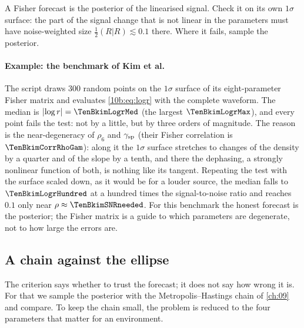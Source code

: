 \begin{keyidea}
A Fisher forecast is the posterior of the linearised signal. Check it on its own $1\sigma$ surface: the part of the
signal change that is not linear in the parameters must have noise-weighted size $\tfrac12(R|R)\lesssim0.1$ there.
Where it fails, sample the posterior.
\end{keyidea}

\paragraph{Example: the benchmark of Kim et al.} The script  draws $300$ random points on the
$1\sigma$ surface of its eight-parameter Fisher matrix and evaluates \eqref{10b:eq:logr} with the complete waveform. The
median is $\lvert\log r\rvert=\TenBkimLogrMed$ (the largest $\TenBkimLogrMax$), and every point fails the test: not by a
little, but by three orders of magnitude. The reason is the near-degeneracy of $\rho_6$ and $\gamma_{\rm sp}$ (their
Fisher correlation is $\TenBkimCorrRhoGam$): along it the $1\sigma$ surface stretches to changes of the density by a
quarter and of the slope by a tenth, and there the dephasing, a strongly nonlinear function of both, is nothing like
its tangent. Repeating the test with the surface scaled down, as it would be for a louder source, the median falls to
$\TenBkimLogrHundred$ at a hundred times the signal-to-noise ratio and reaches $0.1$ only near $\rho\approx\TenBkimSNRneeded$.
For this benchmark the honest forecast is the posterior; the Fisher matrix is a guide to which parameters are
degenerate, not to how large the errors are.

\subsection{A chain against the ellipse}
\label{10b:sec:fisher-vs-mh}

The criterion says whether to trust the forecast; it does not say how wrong it is. For that we sample the posterior
with the Metropolis--Hastings chain of \cref{ch:09} and compare. To keep the chain small, the problem is reduced to
the four parameters that matter for an environment.

